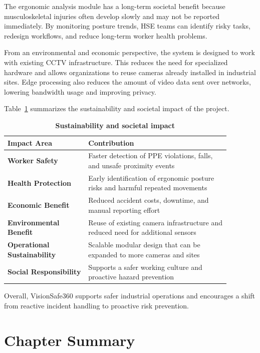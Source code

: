 The ergonomic analysis module has a long-term societal benefit because musculoskeletal injuries often develop slowly and may not be reported immediately. By monitoring posture trends, HSE teams can identify risky tasks, redesign workflows, and reduce long-term worker health problems.

From an environmental and economic perspective, the system is designed to work with existing CCTV infrastructure. This reduces the need for specialized hardware and allows organizations to reuse cameras already installed in industrial sites. Edge processing also reduces the amount of video data sent over networks, lowering bandwidth usage and improving privacy.

Table~\ref{tab:chapter7-sustainability} summarizes the sustainability and societal impact of the project.

\begin{table}[H]
\centering
\renewcommand{\arraystretch}{1.55}
\begin{tabular}{|>{\centering\arraybackslash}p{0.32\linewidth}|>{\centering\arraybackslash}p{0.56\linewidth}|}
\hline
\textbf{Impact Area} & \textbf{Contribution} \\
\hline
\textbf{Worker Safety} & Faster detection of PPE violations, falls, and unsafe proximity events \\
\hline
\textbf{Health Protection} & Early identification of ergonomic posture risks and harmful repeated movements \\
\hline
\textbf{Economic Benefit} & Reduced accident costs, downtime, and manual reporting effort \\
\hline
\textbf{Environmental Benefit} & Reuse of existing camera infrastructure and reduced need for additional sensors \\
\hline
\textbf{Operational Sustainability} & Scalable modular design that can be expanded to more cameras and sites \\
\hline
\textbf{Social Responsibility} & Supports a safer working culture and proactive hazard prevention \\
\hline
\end{tabular}
\caption{\textbf{Sustainability and societal impact}}
\label{tab:chapter7-sustainability}
\end{table}

Overall, VisionSafe360 supports safer industrial operations and encourages a shift from reactive incident handling to proactive risk prevention.

\section{Chapter Summary}


